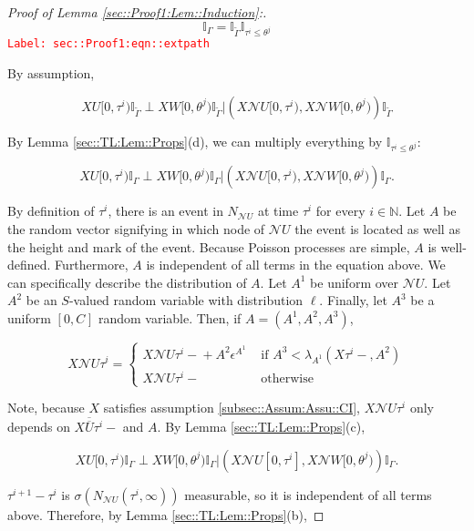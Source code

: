 \documentclass[12pt]{article}
\newcommand{\mb}{\mathbb}
\newcommand{\mc}{\mathcal}
\newcommand{\ov}{\overline}
\newcommand{\te}{\text}
\newcommand{\ep}{\epsilon}
\newcommand{\tr}{\textcolor{red}}
\newcommand{\labe}[1]{\tr{\texttt{Label: #1}}}
\newcommand{\neigh}{\mc{N}}					%
\renewcommand{\U}{U}							%
\newcommand{\UU}{W}								%
\renewcommand{\S}{S}							%
\newcommand{\ev}[1]{\ep^{#1}}					%
\newcommand{\X}{X}								%
\newcommand{\cl}{\ov}							%
\newcommand{\poiss}[1]{N_{#1}}						%
\newcommand{\rt}[1]{\tau^{#1}}						%
\newcommand{\rtt}[1]{\theta^{#1}}					%
\newcommand{\itt}{i}								%
\newcommand{\ittt}{j}								%
\newcommand{\rate}[1]{\lambda_{#1}}					%
\newcommand{\const}[1]{C_{#1}}						%
\newcommand{\Sm}{\ell}								%
\newcommand{\alt}{\widetilde}						%
\newcommand{\apath}{\Gamma}						%
\newcommand{\rv}{A}								%
\begin{document}
\begin{proof}[Proof of Lemma \ref{sec::Proof1:Lem::Induction}:]
\begin{equation}
\mb{I}_{\apath} = \mb{I}_{\alt{\apath}}\mb{I}_{\rt{\itt} \leq \rtt{\ittt}}
\label{sec::Proof1:eqn::extpath}
\end{equation}
\labe{sec::Proof1:eqn::extpath}

By assumption,

\[\X{\U}{[0,\rt{\itt})}\mb{I}_{\alt{\apath}}\perp \X{\UU}{[0,\rtt{\ittt})}\mb{I}_{\alt{\apath}}|\left(\X{\neigh{\U}}{[0,\rt{\itt})},\X{\neigh{\UU}}{[0,\rtt{\ittt})}\right)\mb{I}_{\alt{\apath}}\]

By Lemma \ref{sec::TL:Lem::Props}(d), we can multiply everything by \(\mb{I}_{\rt{\itt} \leq \rtt{\ittt}}\):

\[\X{\U}{[0,\rt{\itt})}\mb{I}_{\apath}\perp \X{\UU}{[0,\rtt{\ittt})}\mb{I}_{\apath}|\left(\X{\neigh{\U}}{[0,\rt{\itt})},\X{\neigh{\UU}}{[0,\rtt{\ittt})}\right)\mb{I}_{\apath}.\]

By definition of \(\rt{\itt}\), there is an event in \(\poiss{\neigh{\U}}\) at time \(\rt{\itt}\) for every \(\itt \in \mb{ N}\). Let \(\rv\) be the random vector signifying in which node of \(\neigh{\U}\) the event is located as well as the height and mark of the event. Because Poisson processes are simple, \(\rv\) is well-defined. Furthermore, \(\rv\) is independent of all terms in the equation above. We can specifically describe the distribution of \(\rv\). Let \(\rv^1\) be uniform over \(\neigh{\U}\). Let \(\rv^2\) be an \(\S\)-valued random variable with distribution \(\Sm\). Finally, let \(\rv^3\) be a uniform \([0,\const{}]\) random variable. Then, if \(\rv=(\rv^1,\rv^2,\rv^3)\),

\[\X{\neigh{\U}}{\rt{\itt}} = \begin{cases}
\X{\neigh{\U}}{\rt{\itt}-} + \rv^2\ev{\rv^1} &\te{ if } \rv^3< \rate{\rv^1}(\X{}{\rt{\itt}-}, \rv^2)\\
\X{\neigh{\U}}{\rt{\itt}-} &\te{ otherwise}
\end{cases}\]

Note, because \(\X{}{}\) satisfies assumption \ref{subsec::Assum:Assu::CI}, \(\X{\neigh{\U}}{\rt{\itt}}\) only depends on \(\X{\cl{\cl{\U}}}{\rt{\itt}-}\) and \(\rv\). By Lemma \ref{sec::TL:Lem::Props}(c), 

\[\X{\U}{[0,\rt{\itt})}\mb{I}_{\apath}\perp \X{\UU}{[0,\rtt{\ittt})}\mb{I}_{\apath}|\left(\X{\neigh{\U}}{[0,\rt{\itt}]},\X{\neigh{\UU}}{[0,\rtt{\ittt})}\right)\mb{I}_{\apath}.\]

\(\rt{\itt+1} - \rt{\itt}\) is \(\sigma(\poiss{\neigh{\U}}(\rt{\itt},\infty))\) measurable, so it is independent of all terms above. Therefore, by Lemma \ref{sec::TL:Lem::Props}(b),


\end{proof}
\end{document}
